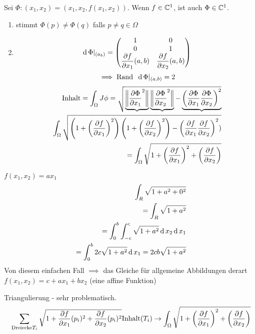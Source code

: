 \begin{Bew}
  Sei $\Phi:(x_1,x_2)=(x_1,x_2, f(x_1,x_2))$. Wenn $f\in\mathbb{C}^1$, ist auch $\Phi\in\mathbb{C}^1$.
  \begin{enumerate}
    \item stimmt $\Phi(p)\neq \Phi(q)$ falls $p\neq q\in\Omega$
    \item 
      \[\operatorname{d}\Phi|_{(a_b)}= \begin{pmatrix}
        1&0\\
        0&1\\
        \dfrac{\partial f}{\partial x_1}(a,b) & \dfrac{\partial f}{\partial x_2}(a,b)
      \end{pmatrix}\]
      \[\implies\text{Rand}\hspace{2mm}\operatorname{d}\Phi|_{(a,b)}=2\]
      \begin{eqnarray*}
        \text{Inhalt} = \int_\Omega J\phi= \sqrt{\underbrace{\left\| \dfrac{\partial \Phi}{\partial x_1}^2 \right\|}\underbrace{\left\| \dfrac{\partial \Phi}{\partial x_2}^2 \right\|}-\underbrace{\left( \dfrac{\partial \Phi}{\partial x_1}\dfrac{\partial \Phi}{\partial x_2} \right)^2}}\\
        \int_\Omega \sqrt{\left( 1+\left( \dfrac{\partial f}{\partial x_1} \right)^2 \right)\left( 1+\left( \dfrac{\partial f}{\partial x_2} \right)^2 \right)-\left( \dfrac{\partial f}{\partial x_1}\dfrac{\partial f}{\partial x_2} \right)^2)}\\
        =\int_\Omega \sqrt{1+\left( \dfrac{\partial f}{\partial x_1} \right)^2+\left( \dfrac{\partial f}{\partial x_2} \right)}
      \end{eqnarray*}
  \end{enumerate}
\end{Bew}
\begin{Bsp}
  $f(x_1,x_2)=ax_1$
  \begin{eqnarray*}
    \int_R\sqrt{1+a^2+0^2}\\
    =\int_R\sqrt{1+a^2}\\
    =\int_0^b\int_{-c}^c\sqrt{1+a^2}\operatorname{d} x_2\operatorname{d} x_1\\
    =\int_0^b2c\sqrt{1+a^2}\operatorname{d} x_1=2cb\sqrt{1+a^2}
  \end{eqnarray*}
  Von diesem einfachen Fall $\implies$ das Gleiche für allgemeine Abbildungen derart $f(x_1,x_2) = c+ax_1+bx_2$ (eine affine Funktion)
\end{Bsp}
\begin{Bem}
  Triangulierung - sehr problematisch.
  \[\sum_{\text{Dreiecke} T_i}\sqrt{1+\dfrac{\partial f}{\partial x_1}(p_i)^2+\dfrac{\partial f}{\partial x_2}(p_i)^2}\text{Inhalt}(T_i)\rightarrow\int_\Omega\sqrt{1+\left( \dfrac{\partial f}{\partial x_1} \right)^2+\left( \dfrac{\partial f}{\partial x_2} \right)}\]
\end{Bem}
